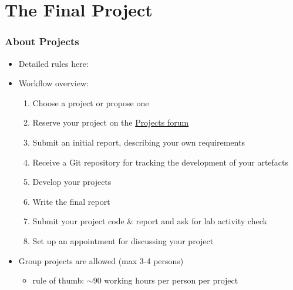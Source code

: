 \documentclass[presentation]{beamer}\mode<presentation>{\usetheme{AMSCesenaPurpleAndGold}}
\begin{document}
\section{The Final Project}

\begin{frame}%
    \frametitle{About Projects}
    \begin{itemize}
        \item Detailed rules here: 

        \vfill

        \item Workflow overview:
        \begin{enumerate}
            \item Choose a project or propose one
            \item Reserve your project on the \href{https://virtuale.unibo.it/mod/forum/view.php?id=331532}{Projects forum}
            \item Submit an \alert{initial report}, describing your own requirements
            \item Receive a Git repository for tracking the development of your artefacts
            \item Develop your projects
            \item Write the \alert{final report}
            \item Submit your project \alert{code \& report} and ask for lab activity check
            \item Set up an appointment for discussing your project
        \end{enumerate}

        \vfill

        \item Group projects are allowed (max 3-4 persons)
        \begin{itemize}
            \item rule of thumb: $\sim90$ working hours per person per project
        \end{itemize}
    \end{itemize}
\end{frame}

\section*{}
\frame{\titlepage}
\end{document}
